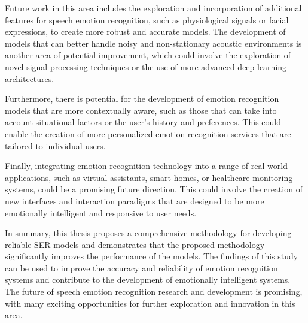Future work in this area includes the exploration and incorporation of additional features for speech emotion recognition, such as physiological signals or facial expressions, to create more robust and accurate models. The development of models that can better handle noisy and non-stationary acoustic environments is another area of potential improvement, which could involve the exploration of novel signal processing techniques or the use of more advanced deep learning architectures.

Furthermore, there is potential for the development of emotion recognition models that are more contextually aware, such as those that can take into account situational factors or the user's history and preferences. This could enable the creation of more personalized emotion recognition services that are tailored to individual users.

Finally, integrating emotion recognition technology into a range of real-world applications, such as virtual assistants, smart homes, or healthcare monitoring systems, could be a promising future direction. This could involve the creation of new interfaces and interaction paradigms that are designed to be more emotionally intelligent and responsive to user needs.

In summary, this thesis proposes a comprehensive methodology for developing reliable SER models and demonstrates that the proposed methodology significantly improves the performance of the models. The findings of this study can be used to improve the accuracy and reliability of emotion recognition systems and contribute to the development of emotionally intelligent systems. The future of speech emotion recognition research and development is promising, with many exciting opportunities for further exploration and innovation in this area.
